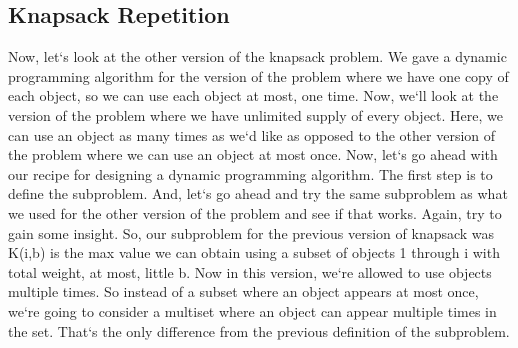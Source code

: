 \subsection{Knapsack Repetition}
Now, let`s look at the other version of the knapsack problem.
We gave a dynamic programming algorithm for the version of the problem where we have one copy of each object, so we can use each object at most, one time.
Now, we`ll look at the version of the problem where we have unlimited supply of every object.
Here, we can use an object as many times as we`d like as opposed to the other version of the problem where we can use an object at most once.
Now, let`s go ahead with our recipe for designing a dynamic programming algorithm.
The first step is to define the subproblem.
And, let`s go ahead and try the same subproblem as what we used for the other version of the problem and see if that works.
Again, try to gain some insight.
So, our subproblem for the previous version of knapsack was K(i,b) is the max value we can obtain using a subset of objects 1 through i with total weight, at most, little b.
Now in this version, we`re allowed to use objects multiple times.
So instead of a subset where an object appears at most once, we`re going to consider a multiset where an object can appear multiple times in the set.
That`s the only difference from the previous definition of the subproblem.

